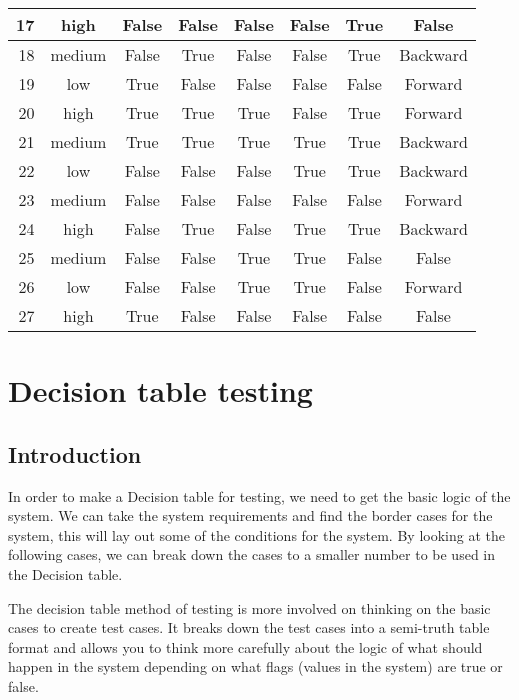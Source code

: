 \documentclass[12pt,letterpaper]{article}
\begin{document}
\begin{tabular}{|r|c|c|c|c|c|c|c|}
17                              & high      & False & False & False   & False   & True  & False    \\ \hline
18                              & medium    & False & True  & False   & False   & True  & Backward \\ \hline
19                              & low       & True  & False & False   & False   & False & Forward  \\ \hline
20                              & high      & True  & True  & True    & False   & True  & Forward  \\ \hline
21                              & medium    & True  & True  & True    & True    & True  & Backward \\ \hline
22                              & low       & False & False & False   & True    & True  & Backward \\ \hline
23                              & medium    & False & False & False   & False   & False & Forward  \\ \hline
24                              & high      & False & True  & False   & True    & True  & Backward \\ \hline
25                              & medium    & False & False & True    & True    & False & False    \\ \hline
26                              & low       & False & False & True    & True    & False & Forward  \\ \hline
27                              & high      & True  & False & False   & False   & False & False    \\ \hline
\end{tabular}


\section{Decision table testing}

\subsection{Introduction}

In order to make a Decision table for testing, we need to get the basic logic of the system.
We can take the system requirements and find the border cases for the system, this will lay
out some of the conditions for the system. By looking at the following cases, we
can break down the cases to a smaller number to be used in the Decision table.

The decision table method of testing is more involved on thinking on the basic cases to create
test cases. It breaks down the test cases into a semi-truth table format and allows you
to think more carefully about the logic of what should happen in the system depending on what
flags (values in the system) are true or false.
\end{document}
